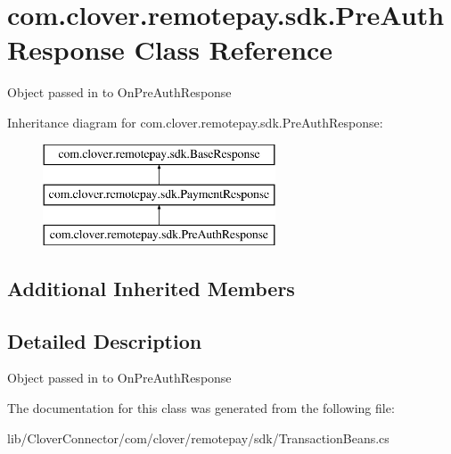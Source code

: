 \hypertarget{classcom_1_1clover_1_1remotepay_1_1sdk_1_1_pre_auth_response}{}\section{com.\+clover.\+remotepay.\+sdk.\+Pre\+Auth\+Response Class Reference}
\label{classcom_1_1clover_1_1remotepay_1_1sdk_1_1_pre_auth_response}


Object passed in to On\+Pre\+Auth\+Response  


Inheritance diagram for com.\+clover.\+remotepay.\+sdk.\+Pre\+Auth\+Response\+:\begin{figure}[H]
\begin{center}
\leavevmode
\includegraphics[height=3.000000cm]{classcom_1_1clover_1_1remotepay_1_1sdk_1_1_pre_auth_response}
\end{center}
\end{figure}
\subsection*{Additional Inherited Members}


\subsection{Detailed Description}
Object passed in to On\+Pre\+Auth\+Response 



The documentation for this class was generated from the following file\+:\begin{DoxyCompactItemize}
\item 
lib/\+Clover\+Connector/com/clover/remotepay/sdk/Transaction\+Beans.\+cs\end{DoxyCompactItemize}
